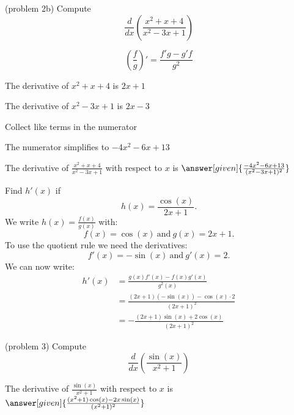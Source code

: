 \documentclass{ximera}
\begin{document}
\begin{problem}(problem 2b)
  Compute
  \[
  \frac{d}{dx} \left(\frac{x^2 + x + 4}{x^2 -3x + 1}\right)
  \]
  
    \begin{hint}
      \[\left(\frac{f}{g}\right)' = \frac{f'g-g'f}{g^2}\]
    \end{hint}
    \begin{hint}
      The derivative of $x^2 + x + 4$ is $2x+1$
    \end{hint}
    \begin{hint}
      The derivative of $x^2 -3x + 1$ is $2x-3$
    \end{hint}
    \begin{hint}
      Collect like terms in the numerator
    \end{hint}
		\begin{hint}
      The numerator simplifies to $-4x^2 -6x +13$
    \end{hint}
		The derivative of $\frac{x^2 + x + 4}{x^2 -3x + 1}$ with respect to $x$ is
		 $\answer[given]{\frac{-4x^2 -6x +13}{(x^2 -3x + 1)^2}}$
		
\end{problem}



\begin{example}[example 3]
Find $h'(x)$ if 
\[
h(x) = \frac{\cos(x)}{2x+1}.
\]
We write $\displaystyle{h(x) = \frac{f(x)}{g(x)}}$ 
with: 
\[f(x) = \cos(x) \ \text{and} \  g(x)= 2x+1.\]
To use the quotient rule we need the derivatives:
\[f'(x) = -\sin(x) \ \text{and} \  g'(x) = 2.\]
We can now write: 
\begin{align*}
h'(x) &= \frac{g(x)f'(x) - f(x)g'(x)}{g^2(x)}\\
&= \frac{(2x+1)(-\sin(x))- \cos(x)\cdot 2}{(2x+1)^2}\\
&= -\frac{(2x+1)\sin(x) + 2\cos(x)}{(2x+1)^2}
\end{align*}
\end{example}



\begin{center}
\begin{foldable}
\end{foldable}
\end{center}


\begin{problem}(problem 3)
  Compute
  \[
  \frac{d}{dx} \left(\frac{\sin(x)}{x^2 + 1}\right)
  \]
  
		The derivative of $\frac{\sin(x)}{x^2 + 1}$ with respect to $x$ is
		 $\answer[given]{\frac{(x^2 + 1)\cos(x) - 2x\sin(x)}{(x^2 + 1)^2}}$
		
\end{problem}
\end{document}
